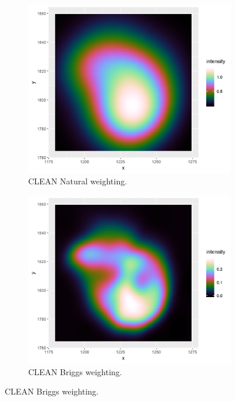 \begin{figure}[h]
	\centering
	\begin{subfigure}[b]{0.3\linewidth}
		\includegraphics[width=1.00\linewidth]{./chapters/10.results/MSClean/Natural-N132.png}
		\caption{CLEAN Natural weighting.}
		\label{results:N132:clean}
	\end{subfigure}
	\begin{subfigure}[b]{0.3\linewidth}
		\includegraphics[width=1.00\linewidth]{./chapters/10.results/MSClean/Briggs-N132.png}
		\caption{CLEAN Briggs weighting.}

\end{subfigure}
\end{figure}
